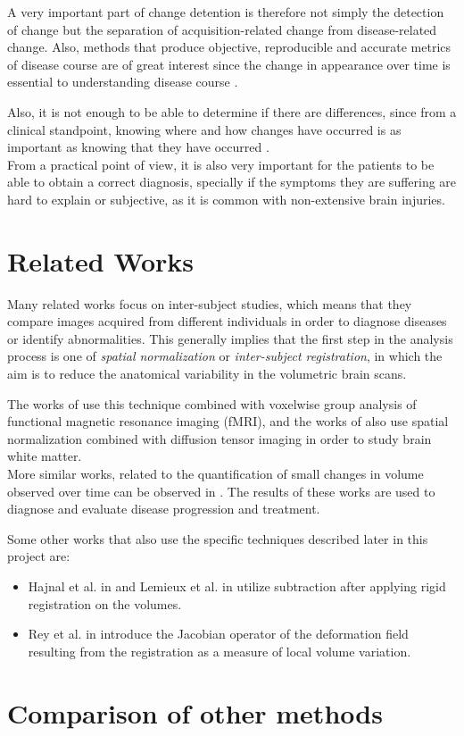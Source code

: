 A very important part of change detention is therefore not simply the detection of change but the separation of acquisition-related change from disease-related change. Also, methods that produce objective, reproducible and accurate metrics of disease course are of great interest since the change in appearance over time is essential to understanding disease course \cite{review1}.

Also, it is not enough to be able to determine if there are differences, since from a clinical standpoint, knowing where and how changes have occurred is as important as knowing that they have occurred \cite{review1}.\\


From a practical point of view, it is also very important for the patients to be able to obtain a correct diagnosis, specially if the symptoms they are suffering are hard to explain or subjective, as it is common with non-extensive brain injuries.

\section{Related Works}
Many related works focus on inter-subject studies, which means that they compare images acquired from different individuals in order to diagnose diseases or identify abnormalities. This generally implies that the first step in the analysis process is one of \textit{spatial normalization} or \textit{inter-subject registration}, in which the aim is to reduce the anatomical variability in the volumetric brain scans.

The works of \cite{zeffiro,svensen} use this technique combined with voxelwise group analysis of functional magnetic resonance imaging (fMRI), and the works of \cite{ardekani1,jones} also use spatial normalization combined with diffusion tensor imaging in order to study brain white matter.\\

More similar works, related to the quantification of small changes in volume observed over time can be observed in \cite{holden,rey}. The results of these works are used to diagnose and evaluate disease progression and treatment.


Some other works that also use the specific techniques described later in this project are:
\begin{itemize}
\item Hajnal et al. in \cite{hajnal} and Lemieux et al. in \cite{lemieux} utilize subtraction after applying rigid registration on the volumes.
\item Rey et al. in \cite{rey} introduce the Jacobian operator of the deformation field resulting from the registration as a measure of local volume variation.
\end{itemize}


\section{Comparison of other methods}
